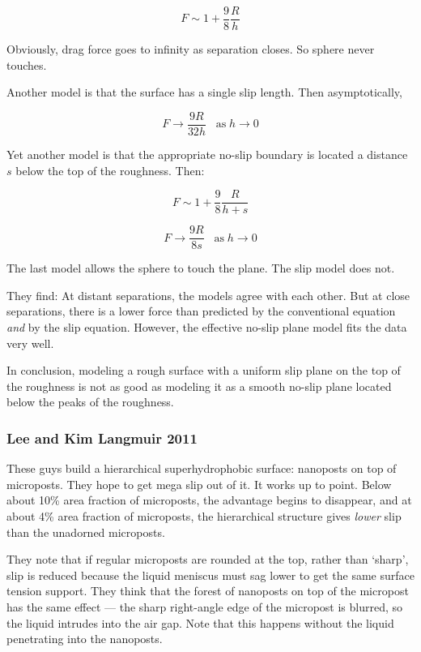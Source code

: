 \documentclass{article}
\begin{document}
\[ F \sim 1 + \frac{9}{8} \frac{R}{h} \]

Obviously, drag force goes to infinity as separation closes.  So sphere never touches.

Another model is that the surface has a single slip length. Then asymptotically,

\[ F \rightarrow \frac{9R}{32h} \;\;\; \mathrm{as}\;h \rightarrow 0 \]

Yet another model is that the appropriate no-slip boundary is located a distance $s$ below the top of the roughness. Then:

\[ F \sim 1 + \frac{9}{8} \frac{R}{h + s} \]

\[ F \rightarrow \frac{9R}{8s}\;\;\; \mathrm{as} \; h \rightarrow 0 \]


The last model allows the sphere to touch the plane.  The slip model does not.

They find: At distant separations, the models agree with each other.  But at close separations, there is a lower force than predicted by the conventional equation \emph{and} by the slip equation.  However, the effective no-slip plane model fits the data very well.

In conclusion, modeling a rough surface with a uniform slip plane on the top of the roughness is not as good as modeling it as a smooth no-slip plane located below the peaks of the roughness.


\subsubsection*{Lee and Kim Langmuir 2011}

These guys build a hierarchical superhydrophobic surface: nanoposts on top of microposts. They hope to get mega slip out of it.  It works up to point.  Below about 10\% area fraction of microposts, the advantage begins to disappear, and at about 4\% area fraction of microposts, the hierarchical structure gives \emph{lower} slip than the unadorned microposts.

They note that if regular microposts are rounded at the top, rather than `sharp', slip is reduced because the liquid meniscus must sag lower to get the same surface tension support.  They think that the forest of nanoposts on top of the micropost has the same effect --- the sharp right-angle edge of the micropost is blurred, so the liquid intrudes into the air gap.  Note that this happens without the liquid penetrating into the nanoposts.
\end{document}
